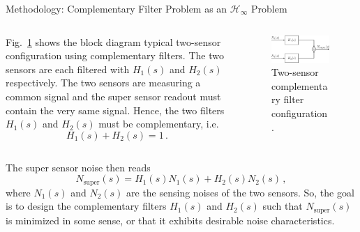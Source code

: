 \documentclass{beamer}
\begin{document}
\begin{frame}[t]
\begin{columns}[t]
\begin{column}{0.32\linewidth}
			\begin{block}{Methodology: Complementary Filter Problem as an $\mathcal{H}_\infty$ Problem}
				\begin{columns}[t, onlytextwidth]
					\begin{column}{0.5\textwidth}
						Fig.~\ref{fig:two-sensor} shows the block diagram typical two-sensor configuration using complementary filters.
						The two sensors are each filtered with $H_1(s)$ and $H_2(s)$ respectively.
						The two sensors are measuring a common signal and the super sensor readout must contain the very same signal.
						Hence, the two filters $H_1(s)$ and $H_2(s)$ must be complementary, i.e.
						\begin{equation}
							H_1(s) + H_2(s) = 1\,.
							\label{eqn:complementary}
						\end{equation}
					\end{column}
					\begin{column}{0.45\textwidth}
						\begin{figure}
							\centering
							\includegraphics[width=1\linewidth]{complementary_filter}
							\caption{Two-sensor complementary filter configuration.}
							\label{fig:two-sensor}
						\end{figure}
					\end{column}
				\end{columns}
			
			\medskip
			
			The super sensor noise then reads
			\begin{equation}
				N_\text{super}(s) = H_1(s)N_1(s) + H_2(s)N_2(s)\,,
				\label{eqn:noise_super}
			\end{equation}
			where $N_1(s)$ and $N_2(s)$ are the sensing noises of the two sensors.
			So, the goal is to design the complementary filters $H_1(s)$ and $H_2(s)$ such that $N_\text{super}(s)$ is minimized in some sense, or that it exhibits desirable noise characteristics.
			

\end{block}
\end{column}
\end{columns}
\end{frame}
\end{document}
